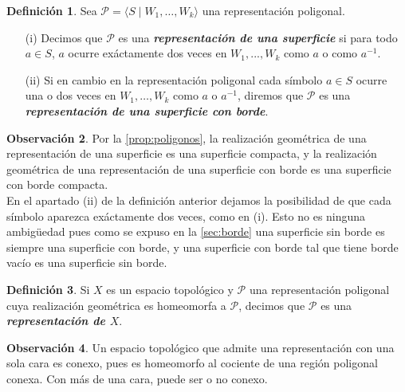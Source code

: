 \documentclass[10pt]{report}
\newcommand{\enfatiza}[1]{\textbf{\textit{#1}}}
\theoremstyle{definition}
\newtheorem{defin}{Definición}[section]
\newtheorem{obs}[defin]{Observación}
\begin{document}
\begin{defin}%
Sea $\mathcal{P} =\langle S\mid W_1,\dots ,W_k\rangle$ una representación poligonal. 
\begin{itemize}
\item[(i)] Decimos que $\mathcal{P}$ es una \enfatiza{representación de una superficie} si para todo $a\in S$, $a$ ocurre exáctamente dos veces en $W_1,...,W_k$ como $a$ o como $a^{-1}$.
\item[(ii)] Si en cambio en la representación poligonal cada símbolo $a\in S$ ocurre una o dos veces en $W_1,\dots ,W_k$ como $a$ o $a^{-1}$, diremos que $\mathcal{P}$ es una \enfatiza{representación de una superficie con borde}. 
\end{itemize}
\end{defin}
\begin{obs}%
Por la \autoref{prop:poligonos}, la realización geométrica de una representación de una superficie es una superficie compacta, y la realización geométrica de una representación de una superficie con borde es una superficie con borde compacta.\\
En el apartado (ii) de la definición anterior dejamos la posibilidad de que cada símbolo aparezca exáctamente dos veces, como en (i). Esto no es ninguna ambigüedad pues como se expuso en la \autoref{sec:borde} una superficie sin borde es siempre una superficie con borde, y una superficie con borde tal que tiene borde vacío es una superficie sin borde.
\end{obs}
\begin{defin}%
Si $X$ es un espacio topológico y $\mathcal{P}$ una representación poligonal cuya realización geométrica es homeomorfa a $\mathcal{P}$, decimos que $\mathcal{P}$ es una \textbf{\emph{representación de $X$}}.
\end{defin}
\begin{obs}%
Un espacio topológico que admite una representación con una sola cara es conexo, pues es homeomorfo al cociente de una región poligonal conexa. Con más de una cara, puede ser o no conexo.
\end{obs}
\end{document}
